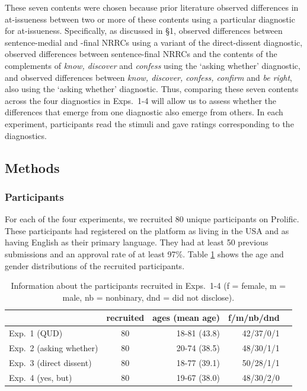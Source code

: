 \documentclass[times,linguex,xcolor]{glossa}
\begin{document}
  These seven contents were chosen because prior literature observed differences in at-issueness between two or more of these contents using a particular diagnostic for at-issueness.  Specifically, as discussed in \S1, \citealt{syrett_experimental_2015} observed differences between sentence-medial and -final NRRCs using a variant of the direct-dissent diagnostic, \citealt{tonhauser_how_2018} observed differences between sentence-final NRRCs and the contents of the complements of \emph{know, discover} and \emph{confess} using the `asking whether' diagnostic, and \citealt{degen-tonhauser-glossa} observed differences between \emph{know, discover, confess, confirm} and \emph{be right}, also using the `asking whether' diagnostic. Thus, comparing these seven contents across the four diagnostics in Exps.~1-4 will allow us to assess whether the differences that emerge from one diagnostic also emerge from others. In each experiment, participants read the stimuli and gave ratings corresponding to the diagnostics.

  \subsection{Methods}
    
  \subsubsection{Participants}

  For each of the four experiments, we recruited 80 unique participants on Prolific. These participants had registered on the platform as living in the USA and as having English as their primary language. They had at least 50 previous submissions and an approval rate of at least 97\%.  Table \ref{t:recruited} shows the age and gender distributions of the recruited participants.

  \begin{table}[h!]
  \centering
  \begin{tabular}{l | c | r r r }
              & recruited & ages (mean age) & f/m/nb/dnd \\ \hline
  Exp.~1 (QUD) & 80 & 18-81 (43.8) & 42/37/0/1  \\
  Exp.~2 (asking whether) & 80 & 20-74 (38.5)  & 48/30/1/1  \\
  Exp.~3 (direct dissent) & 80 & 18-77 (39.1) & 50/28/1/1  \\
  Exp.~4 (yes, but) &80 & 19-67 (38.0)  & 48/30/2/0 &  \\
  \hline
  \end{tabular}

  \caption{Information about the participants recruited in Exps.~1-4 (f = female, m = male, nb = nonbinary, dnd = did not disclose).}\label{t:recruited}
  \end{table}
\end{document}
